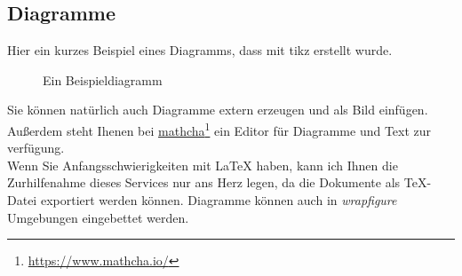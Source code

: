 \subsection{Diagramme}
    Hier ein kurzes Beispiel eines Diagramms, dass mit tikz erstellt wurde.\\[1cm]
    \begin{figure}[h]
        \centering
        \caption{Ein Beispieldiagramm}
        \label{fig:diagram}

    \end{figure}
    
    Sie können natürlich auch Diagramme extern erzeugen und als Bild einfügen. Außerdem steht Ihenen bei \href{https://www.mathcha.io/}{mathcha}\footnote[1]{ \href{https://www.mathcha.io/}{https://www.mathcha.io/}} ein Editor für Diagramme und Text zur verfügung.\\
    Wenn Sie Anfangsschwierigkeiten mit \LaTeX{} haben, kann ich Ihnen die Zurhilfenahme dieses Services nur ans Herz legen, da die Dokumente als TeX-Datei exportiert werden können.
    Diagramme können auch in \emph{wrapfigure} Umgebungen eingebettet werden.
